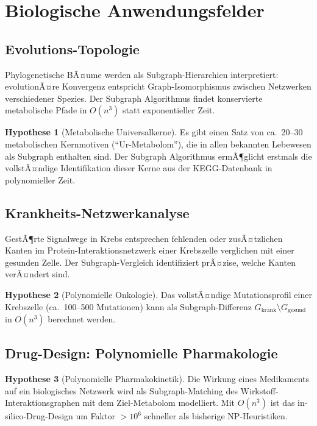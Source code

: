 ﻿\documentclass[a4paper,12pt]{scrreprt}
\theoremstyle{definition}
\newtheorem{hypothese}{Hypothese}[section]
\begin{document}
\section{Biologische Anwendungsfelder}

\subsection{Evolutions-Topologie}

Phylogenetische BÃ¤ume werden als Subgraph-Hierarchien interpretiert:
evolutionÃ¤re Konvergenz entspricht Graph-Isomorphismus zwischen
Netzwerken verschiedener Spezies. Der Subgraph Algorithmus findet
konservierte metabolische Pfade in $O(n^3)$ statt exponentieller Zeit.

\begin{hypothese}[Metabolische Universalkerne]
  Es gibt einen Satz von ca.\ 20--30 metabolischen Kernmotiven
  (``Ur-Metabolom''), die in allen bekannten Lebewesen als Subgraph
  enthalten sind. Der Subgraph Algorithmus ermÃ¶glicht erstmals die
  vollstÃ¤ndige Identifikation dieser Kerne aus der KEGG-Datenbank
  in polynomieller Zeit.
\end{hypothese}

\subsection{Krankheits-Netzwerkanalyse}

GestÃ¶rte Signalwege in Krebs entsprechen fehlenden oder zusÃ¤tzlichen
Kanten im Protein-Interaktionsnetzwerk einer Krebszelle verglichen mit
einer gesunden Zelle. Der Subgraph-Vergleich identifiziert prÃ¤zise,
welche Kanten verÃ¤ndert sind.

\begin{hypothese}[Polynomielle Onkologie]
  Das vollstÃ¤ndige Mutationsprofil einer Krebszelle (ca.\ 100--500
  Mutationen) kann als Subgraph-Differenz $G_{\mathrm{krank}} \setminus
  G_{\mathrm{gesund}}$ in $O(n^3)$ berechnet werden.
\end{hypothese}

\subsection{Drug-Design: Polynomielle Pharmakologie}

\begin{hypothese}[Polynomielle Pharmakokinetik]
  Die Wirkung eines Medikaments auf ein biologisches Netzwerk wird
  als Subgraph-Matching des Wirkstoff-Interaktionsgraphen mit dem
  Ziel-Metabolom modelliert. Mit $O(n^3)$ ist das
  in-silico-Drug-Design um Faktor $> 10^6$ schneller als bisherige
  NP-Heuristiken.
\end{hypothese}
\end{document}
